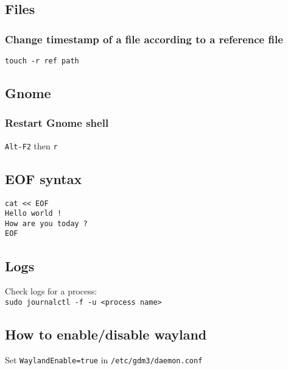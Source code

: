 \subsection{Files}
\subsubsection{Change timestamp of a file according to a reference file}
\verb|touch -r ref path|

\subsection{Gnome}
\subsubsection{Restart Gnome shell}
\verb|Alt-F2| then \verb|r|

\subsection{EOF syntax}
\begin{verbatim}
cat << EOF
Hello world !
How are you today ?
EOF
\end{verbatim}

\subsection{Logs}
Check logs for a process:\\
\verb|sudo journalctl -f -u <process name>|

\subsection{How to enable/disable wayland}
Set \verb|WaylandEnable=true| in \verb|/etc/gdm3/daemon.conf|
